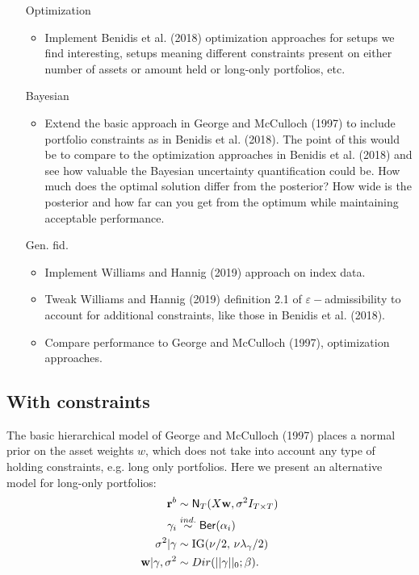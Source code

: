 \documentclass[a4paper, 12pt]{article}
\theoremstyle{plain}
\theoremstyle{definition}
\theoremstyle{remark}
\newcommand{\ber}{{\sf Ber}}
\newcommand{\nm}{{\sf N}}
\newcommand{\eps}{\varepsilon}
\begin{document}
\begin{itemize}
	\item[Optimization]
		\begin{itemize}
		\item Implement Benidis et al. (2018) optimization approaches for setups we find interesting, setups meaning different constraints present on either number of assets or amount held or long-only portfolios, etc.
	\end{itemize}
	\item[Bayesian]
	\begin{itemize}
		\item Extend the basic approach in George and McCulloch (1997) to include portfolio constraints as in Benidis et al. (2018).  The point of this would be to compare to the optimization approaches in Benidis et al. (2018) and see how valuable the Bayesian uncertainty quantification could be.  How much does the optimal solution differ from the posterior?  How wide is the posterior and how far can you get from the optimum while maintaining acceptable performance.
	\end{itemize}
	\item[Gen. fid.]
		\begin{itemize}
			\item Implement Williams and Hannig (2019) approach on index data.
			\item Tweak Williams and Hannig (2019) definition 2.1 of $\eps-$admissibility to account for additional constraints, like those in Benidis et al. (2018).
			\item Compare performance to George and McCulloch (1997), optimization approaches.
	\end{itemize}
\end{itemize}

\subsection{With constraints}
The basic hierarchical model of George and McCulloch (1997) places a normal prior on the asset weights $w$, which does not take into account any type of holding constraints, e.g. long only portfolios.  Here we present an alternative model for long-only portfolios:
\begin{align}
\textbf{r}^b &\sim \nm_{T}(X\textbf{w}, \sigma^2I_{T\times T})\\
\gamma_i &\stackrel{ind.}{\sim} \ber(\alpha_i) \\
\sigma^2 | \gamma & \sim \text{IG}(\nu/2,\,\nu\lambda_\gamma/2)\\
\textbf{w}|\gamma, \sigma^2 & \sim Dir(||\gamma||_0; \beta).
\end{align}
\end{document}
